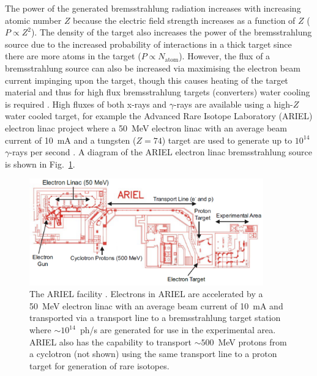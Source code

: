 \documentclass[../main.tex]{subfiles}
\begin{document}
The power of the generated bremsstrahlung radiation increases with increasing atomic number $Z$ because the electric field strength increases as a function of $Z$ ($P \propto Z^{2}$). The density of the target also increases the power of the bremsstrahlung source due to the increased probability of interactions in a thick target since there are more atoms in the target ($P \propto N_{\mathrm{atom}}$). However, the flux of a bremsstrahlung source can also be increased via maximising the electron beam current impinging upon the target, though this causes heating of the target material and thus for high flux bremsstrahlung targets (converters) water cooling is required \cite{auslender2004bremsstrahlung}. High fluxes of both x-rays and $\gamma$-rays are available using a high-$Z$ water cooled target, for example the Advanced Rare Isotope Laboratory (ARIEL) electron linac project \cite{dilling2013ariel} where a 50~\si{\mega\electronvolt} electron linac with an average beam current of 10~\si{\milli\ampere} and a tungsten ($Z = 74$) target are used to generate up to $10^{14}$ $\gamma$-rays per second \cite{lebois2011simulations}. A diagram of the ARIEL electron linac bremsstrahlung source is shown in Fig.~\ref{fig:ARIEL_facility}.
\begin{figure}[!h]
\centering
\includegraphics[width=0.9\textwidth]{Figures/Introduction/ARIEL_facility_fixed.pdf}
\caption{The ARIEL facility \cite{dilling2013ariel}. Electrons in ARIEL are accelerated by a 50~\si{\mega\electronvolt} electron linac with an average beam current of 10~\si{\milli\ampere} and transported via a transport line to a bremsstrahlung target station where $\sim 10^{14}$~ph/\si{\second} are generated for use in the experimental area. ARIEL also has the capability to transport $\sim500$~\si{\mega\electronvolt} protons from a cyclotron (not shown) using the same transport line to a proton target for generation of rare isotopes.}
\label{fig:ARIEL_facility}
\end{figure}
\end{document}
